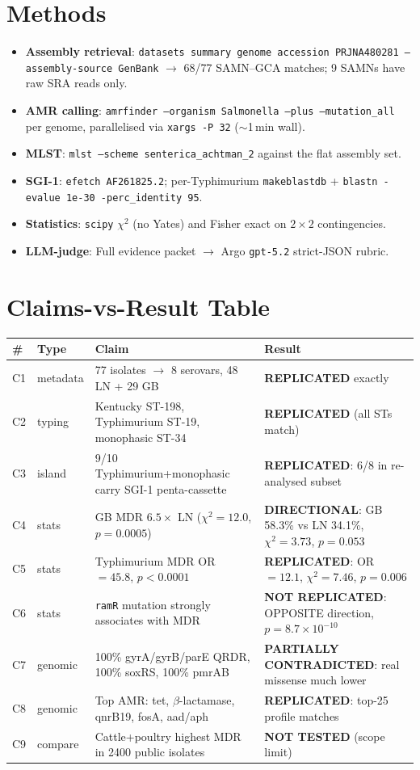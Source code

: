 \documentclass[11pt]{article}
\begin{document}
\section{Methods}
\begin{itemize}
  \item \textbf{Assembly retrieval}: \texttt{datasets summary genome accession PRJNA480281 --assembly-source GenBank} $\rightarrow$ 68/77 SAMN--GCA matches; 9 SAMNs have raw SRA reads only.
  \item \textbf{AMR calling}: \texttt{amrfinder --organism Salmonella --plus --mutation\_all} per genome, parallelised via \texttt{xargs -P 32} ($\sim$1\,min wall).
  \item \textbf{MLST}: \texttt{mlst --scheme senterica\_achtman\_2} against the flat assembly set.
  \item \textbf{SGI-1}: \texttt{efetch AF261825.2}; per-Typhimurium \texttt{makeblastdb} + \texttt{blastn -evalue 1e-30 -perc\_identity 95}.
  \item \textbf{Statistics}: \texttt{scipy} $\chi^2$ (no Yates) and Fisher exact on $2\times2$ contingencies.
  \item \textbf{LLM-judge}: Full evidence packet $\rightarrow$ Argo \texttt{gpt-5.2} strict-JSON rubric.
\end{itemize}

\section{Claims-vs-Result Table}
\begin{longtable}{p{0.4cm}p{2.0cm}p{6.5cm}p{4.5cm}}
\toprule
\# & Type & Claim & Result \\
\midrule
\endhead
C1 & metadata & 77 isolates $\to$ 8 serovars, 48 LN + 29 GB & \textbf{REPLICATED} exactly \\
C2 & typing & Kentucky ST-198, Typhimurium ST-19, monophasic ST-34 & \textbf{REPLICATED} (all STs match) \\
C3 & island & 9/10 Typhimurium+monophasic carry SGI-1 penta-cassette & \textbf{REPLICATED}: 6/8 in re-analysed subset \\
C4 & stats & GB MDR $6.5\times$ LN ($\chi^2{=}12.0$, $p{=}0.0005$) & \textbf{DIRECTIONAL}: GB 58.3\% vs LN 34.1\%, $\chi^2{=}3.73$, $p{=}0.053$ \\
C5 & stats & Typhimurium MDR OR $=45.8$, $p{<}0.0001$ & \textbf{REPLICATED}: OR $=12.1$, $\chi^2{=}7.46$, $p{=}0.006$ \\
C6 & stats & \texttt{ramR} mutation strongly associates with MDR & \textbf{NOT REPLICATED}: OPPOSITE direction, $p{=}8.7{\times}10^{-10}$ \\
C7 & genomic & 100\% gyrA/gyrB/parE QRDR, 100\% soxRS, 100\% pmrAB & \textbf{PARTIALLY CONTRADICTED}: real missense much lower \\
C8 & genomic & Top AMR: tet, $\beta$-lactamase, qnrB19, fosA, aad/aph & \textbf{REPLICATED}: top-25 profile matches \\
C9 & compare & Cattle+poultry highest MDR in 2400 public isolates & \textbf{NOT TESTED} (scope limit) \\
\bottomrule
\end{longtable}
\end{document}
